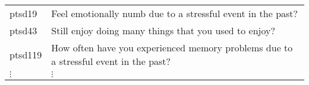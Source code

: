 \begin{tabular}{R{.5in}L{5in}}\hline
  ptsd19 & Feel emotionally numb due to a stressful event in the past?\\
  ptsd43 & Still enjoy doing many things that you used to enjoy? \\
  ptsd119& How often have you experienced memory problems due to a stressful event in the past?  \\ $\vdots$ & $\vdots$\\\hline
\end{tabular}                         